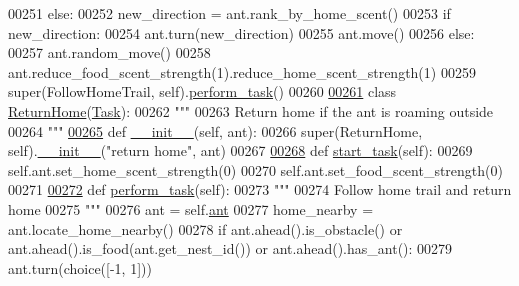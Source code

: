 \begin{DoxyCode}
00251         \textcolor{keywordflow}{else}:
00252             new\_direction = ant.rank\_by\_home\_scent()
00253             \textcolor{keywordflow}{if} new\_direction:
00254                 ant.turn(new\_direction)
00255                 ant.move()
00256             \textcolor{keywordflow}{else}:
00257                 ant.random\_move()
00258         ant.reduce\_food\_scent\_strength(1).reduce\_home\_scent\_strength(1)
00259         super(FollowHomeTrail, self).\hyperlink{classtask__manager_1_1FollowHomeTrail_ae4386ef7470e20e3f42fab9fc65b70cb}{perform\_task}()
00260 
\hypertarget{task__manager_8py_source_l00261}{}\hyperlink{classtask__manager_1_1ReturnHome}{00261} \textcolor{keyword}{class }\hyperlink{classtask__manager_1_1ReturnHome}{ReturnHome}(\hyperlink{classtask__manager_1_1Task}{Task}):
00262     \textcolor{stringliteral}{"""}
00263 \textcolor{stringliteral}{    Return home if the ant is roaming outside}
00264 \textcolor{stringliteral}{    """}
\hypertarget{task__manager_8py_source_l00265}{}\hyperlink{classtask__manager_1_1ReturnHome_ada66b785625008db20221e1b53d419f6}{00265}     \textcolor{keyword}{def }\hyperlink{classtask__manager_1_1ReturnHome_ada66b785625008db20221e1b53d419f6}{\_\_init\_\_}(self, ant):
00266         super(ReturnHome, self).\hyperlink{classtask__manager_1_1ReturnHome_ada66b785625008db20221e1b53d419f6}{\_\_init\_\_}(\textcolor{stringliteral}{"return home"}, ant)        
00267 
\hypertarget{task__manager_8py_source_l00268}{}\hyperlink{classtask__manager_1_1ReturnHome_a8201892f7668c2ca1e7c08f2a51c4309}{00268}     \textcolor{keyword}{def }\hyperlink{classtask__manager_1_1ReturnHome_a8201892f7668c2ca1e7c08f2a51c4309}{start\_task}(self):
00269         self.ant.set\_home\_scent\_strength(0)
00270         self.ant.set\_food\_scent\_strength(0)
00271 
\hypertarget{task__manager_8py_source_l00272}{}\hyperlink{classtask__manager_1_1ReturnHome_ab9d2b69cbefdeaf308df564c13f5aac2}{00272}     \textcolor{keyword}{def }\hyperlink{classtask__manager_1_1ReturnHome_ab9d2b69cbefdeaf308df564c13f5aac2}{perform\_task}(self):
00273         \textcolor{stringliteral}{"""}
00274 \textcolor{stringliteral}{        Follow home trail and return home}
00275 \textcolor{stringliteral}{        """}
00276         ant = self.\hyperlink{classtask__manager_1_1Task_ac43e25887825a1bb6e3d4a5a049968be}{ant}
00277         home\_nearby = ant.locate\_home\_nearby()
00278         \textcolor{keywordflow}{if} ant.ahead().is\_obstacle() \textcolor{keywordflow}{or} ant.ahead().is\_food(ant.get\_nest\_id()) \textcolor{keywordflow}{or} ant.ahead().has\_ant():
00279             ant.turn(choice([-1, 1]))

\end{DoxyCode}

